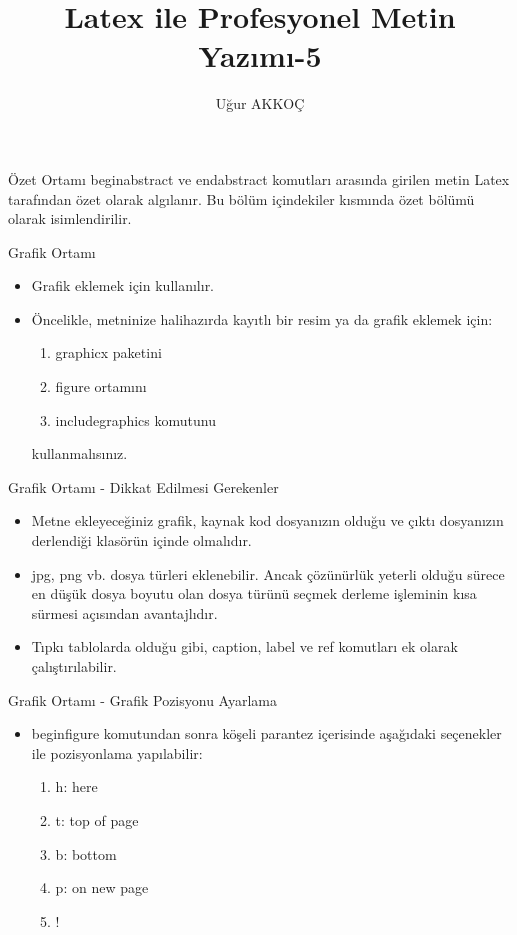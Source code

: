 \documentclass[pdf]{beamer}
\title{Latex ile Profesyonel Metin Yazımı-5}
\author{Uğur AKKOÇ}
\begin{document}
  
	\shorthandoff{=}
	\maketitle
	
	
\begin{frame}{Özet Ortamı}
	begin{abstract} ve end{abstract} komutları arasında girilen metin Latex tarafından özet olarak algılanır. Bu bölüm içindekiler kısmında özet bölümü olarak isimlendirilir.
\end{frame}

\begin{frame}{Grafik Ortamı}
\begin{itemize}
	\item Grafik eklemek için kullanılır.
	\item Öncelikle, metninize halihazırda kayıtlı bir resim ya da grafik eklemek için:
	\begin{enumerate}
		\item graphicx paketini
		\item figure ortamını
		\item includegraphics komutunu
	\end{enumerate}
kullanmalısınız.
\end{itemize}
\end{frame}

\begin{frame}{Grafik Ortamı - Dikkat Edilmesi Gerekenler}
\begin{itemize}
	\item Metne ekleyeceğiniz grafik, kaynak kod dosyanızın olduğu ve çıktı dosyanızın derlendiği klasörün içinde olmalıdır.
	\item jpg, png vb. dosya türleri eklenebilir. Ancak çözünürlük yeterli olduğu sürece en düşük dosya boyutu olan dosya türünü seçmek derleme işleminin kısa sürmesi açısından avantajlıdır.
	\item Tıpkı tablolarda olduğu gibi, caption, label ve ref komutları ek olarak çalıştırılabilir.
\end{itemize}
\end{frame}


\begin{frame}{Grafik Ortamı - Grafik Pozisyonu Ayarlama}
\begin{itemize}
	\item begin{figure} komutundan sonra köşeli parantez içerisinde aşağıdaki seçenekler ile pozisyonlama yapılabilir:
		\begin{enumerate}
			\item h: here
			\item t: top of page
			\item b: bottom
			\item p: on new page
			\item !
		\end{enumerate}
\end{itemize}
\end{frame}
\end{document}

